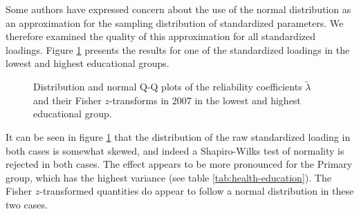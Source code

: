 \documentclass[a4paper,11pt]{article}
\renewcommand{\l}{\lambda}
\newcommand{\0}{\boldsymbol{0}}
\begin{document}
Some authors have expressed concern about the use of the normal distribution as an approximation for
the sampling distribution of standardized parameters. We therefore examined the quality of
this approximation for all standardized loadings. Figure \ref{fig:normal} presents the results for one of the 
standardized loadings in the lowest and highest educational groups.
\begin{figure}[tb]
\centering
{}
 	\caption{Distribution and normal Q-Q plots of the reliability coefficients $\tilde\l$ and their Fisher $z$-transforms
 	 in 2007 in the lowest and highest educational group.}\label{fig:normal}
\end{figure}
It can be seen in figure \ref{fig:normal} that the distribution of the raw standardized loading in both cases is somewhat skewed,
and indeed a Shapiro-Wilks test of normality is rejected in both cases. The effect appears to be more pronounced for the 
Primary group, which has the highest variance (see table \ref{tab:health-education}).
The Fisher $z$-transformed quantities do appear to follow a normal distribution in these two cases.
\end{document}
